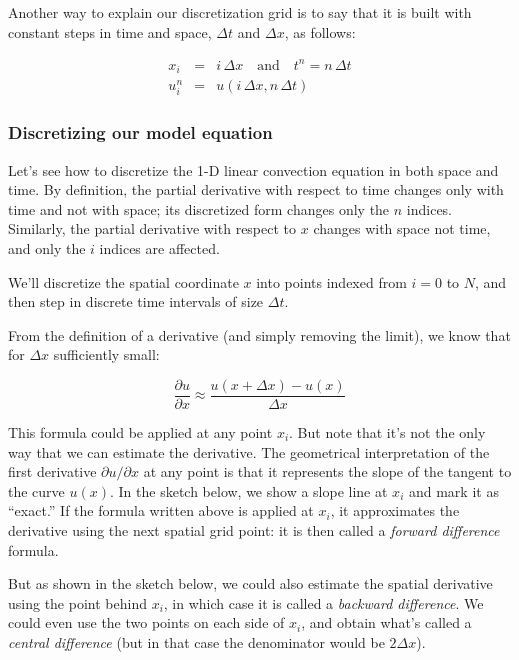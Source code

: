 \documentclass{article}
\begin{document}
Another way to explain our discretization grid is to say that it is
built with constant steps in time and space, \(\Delta t\) and
\(\Delta x\), as follows:

\begin{eqnarray}
x_i &=& i\, \Delta x \quad \text{and} \quad t^n= n\, \Delta t \nonumber \\
u_i^n &=& u(i\, \Delta x, n\, \Delta t)
\end{eqnarray}

    \subsubsection{Discretizing our model
equation}\label{discretizing-our-model-equation}

    Let's see how to discretize the 1-D linear convection equation in both
space and time. By definition, the partial derivative with respect to
time changes only with time and not with space; its discretized form
changes only the \(n\) indices. Similarly, the partial derivative with
respect to \(x\) changes with space not time, and only the \(i\) indices
are affected.

We'll discretize the spatial coordinate \(x\) into points indexed from
\(i=0\) to \(N\), and then step in discrete time intervals of size
\(\Delta t\).

From the definition of a derivative (and simply removing the limit), we
know that for \(\Delta x\) sufficiently small:

\begin{equation}\frac{\partial u}{\partial x}\approx \frac{u(x+\Delta x)-u(x)}{\Delta x}\end{equation}

This formula could be applied at any point \(x_i\). But note that it's
not the only way that we can estimate the derivative. The geometrical
interpretation of the first derivative \(\partial u/ \partial x\) at any
point is that it represents the slope of the tangent to the curve
\(u(x)\). In the sketch below, we show a slope line at \(x_i\) and mark
it as ``exact.'' If the formula written above is applied at \(x_i\), it
approximates the derivative using the next spatial grid point: it is
then called a \emph{forward difference} formula.

But as shown in the sketch below, we could also estimate the spatial
derivative using the point behind \(x_i\), in which case it is called a
\emph{backward difference}. We could even use the two points on each
side of \(x_i\), and obtain what's called a \emph{central difference}
(but in that case the denominator would be \(2\Delta x\)).
\end{document}
